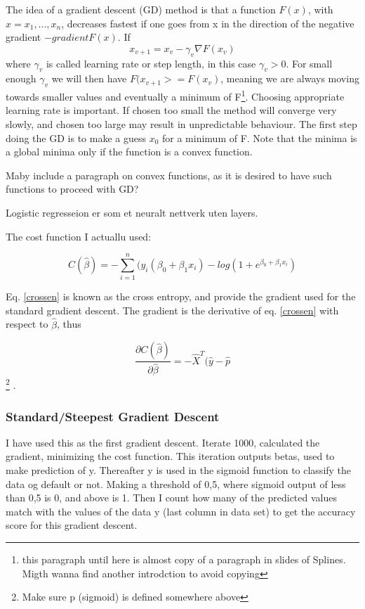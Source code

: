 \documentclass[a4paper,11pt,twocolumn]{article}
\begin{document}
The idea of a gradient descent (GD) method is that a function $F(x)$, with $x=x_1,...,x_n$, decreases fastest if one goes from x in the direction of the negative gradient $-gradientF(x)$. If 
\begin{equation}
x_{v+1}=x_v-\gamma_v\nabla F(x_v)
\label{GD1}
\end{equation}
where $\gamma_v$ is called learning rate or step length, in this case $\gamma_v>0$. For small enough $\gamma_v$ we will then have $F(x_{v+1}>=F(x_v)$, meaning we are always moving towards smaller values and eventually a minimum of F\footnote{this paragraph until here is almost copy of a paragraph in slides of Splines. Migth wanna find another introdction to avoid copying}. Choosing appropriate learning rate is important. If chosen too small the method will converge very slowly, and chosen too large may result in unpredictable behaviour. The first step doing the GD is to make a guess $x_0$ for a minimum of F. Note that the minima is a global minima only if the function is a convex function. 

Maby include a paragraph on convex functions, as it is desired to have such functions to proceed with GD?




Logistic regresseion er som et neuralt nettverk uten layers. 

The cost function I actuallu used: 

\begin{equation}
C(\hat{\beta})=-\sum\limits_{i=1}^n (y_i(\beta_0+\beta_1x_i)-log(1+e^{\beta_0+\beta_1x_i})
\label{crossen}
\end{equation}

Eq. \eqref{crossen} is known as the cross entropy, and provide the gradient used for the standard gradient descent. The gradient is the derivative of eq. \eqref{crossen} with respect to $\hat{\beta}$, thus

\begin{equation}
\frac{\partial C(\hat{\beta})}{\partial \hat{\beta}} = -\hat{X}^T(\hat{y}-\hat{p}
\end{equation} 
\footnote{Make sure p (sigmoid) is defined somewhere above}
\cite{slides}. 

\subsubsection{Standard/Steepest Gradient Descent}
I have used this as the first gradient descent. Iterate 1000, calculated the gradient, minimizing the cost function. This iteration outputs betas, used to make prediction of y. Thereafter y is used in the sigmoid function to classify the data og default or not. Making a threshold of 0,5, where sigmoid output of less than 0,5 is 0, and above is 1. Then I count how many of the predicted values match with the values of the data y (last column in data set) to get the accuracy score for this gradient descent.  
\end{document}
